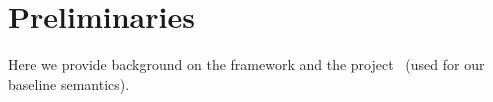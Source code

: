 \section{Preliminaries}
\label{sec:Prelim}

Here we provide background on the \K framework and the \Strata project~\cite{Heule2016a} (used for our baseline semantics).


%




